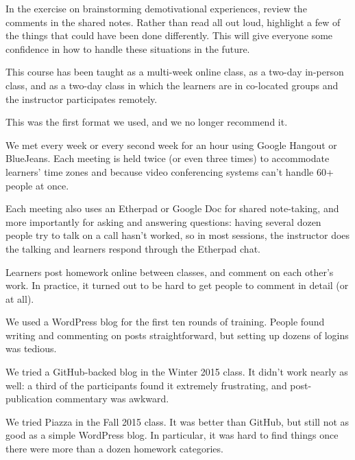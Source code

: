 
In the exercise on brainstorming demotivational experiences, review
the comments in the shared notes. Rather than read all out loud,
highlight a few of the things that could have been done
differently. This will give everyone some confidence in how to handle
these situations in the future.


This course has been taught as a multi-week online class, as a two-day
in-person class, and as a two-day class in which the learners are in
co-located groups and the instructor participates remotely.


This was the first format we used, and we no longer recommend it.

\begin{gitemize}

\item
  We met every week or every second week for an hour using Google
  Hangout or BlueJeans. Each meeting is held twice (or even three
  times) to accommodate learners' time zones and because video
  conferencing systems can't handle 60+ people at once.

\item
  Each meeting also uses an Etherpad or Google Doc for shared
  note-taking, and more importantly for asking and answering
  questions: having several dozen people try to talk on a call hasn't
  worked, so in most sessions, the instructor does the talking and
  learners respond through the Etherpad chat.

\item
  Learners post homework online between classes, and comment on each
  other's work.  In practice, it turned out to be hard to get people
  to comment in detail (or at all).

\item
  We used a WordPress blog for the first ten rounds of training.
  People found writing and commenting on posts straightforward, but
  setting up dozens of logins was tedious.

\item
  We tried a GitHub-backed blog in the Winter 2015 class. It didn't
  work nearly as well: a third of the participants found it extremely
  frustrating, and post-publication commentary was awkward.

\item
  We tried Piazza in the Fall 2015 class. It was better than GitHub,
  but still not as good as a simple WordPress blog. In particular, it
  was hard to find things once there were more than a dozen homework
  categories.

\end{gitemize}

